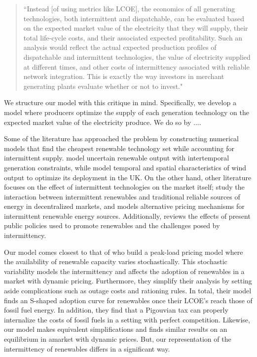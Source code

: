 \documentclass[11pt,a4paper]{extarticle}
\begin{document}
\begin{quote}
	``Instead [of using metrics like LCOE], the economics of all generating technologies, both intermittent and dispatchable, can be evaluated based on the expected market value of the electricity that
	they will supply, their total life-cycle costs, and their associated expected profitability. Such an
	analysis would reflect the actual expected production profiles of dispatchable and intermittent
	technologies, the value of electricity supplied at different times, and other costs of intermittency
	associated with reliable network integration. This is exactly the way investors in merchant generating plants evaluate whether or not to invest."
\end{quote}
We structure our model with this critique in mind. Specifically, we develop a model where producers optimize the supply of each generation technology on the expected market value of the electricity produce. We do so by ....

Some of the literature has approached the problem by constructing numerical models that find the cheapest renewable technology set while accounting for intermittent supply. \citet{MN2006} model uncertain renewable output with intertemporal generation constraints, while \citet{NCK2007} model temporal and spatial characteristics of wind output to optimize its deployment in the UK. On the other hand, other literature focuses on the effect of intermittent technologies on the market itself; \citet{AC2012} study the interaction between intermittent renewables and traditional reliable sources of energy in decentralized markets, and \citet{Chao2011} models alternative pricing mechanisms for intermittent renewable energy sources. Additionally, \citet{Boren2012} reviews the effects of present public policies used to promote renewables and the challenges posed by intermittency. 

Our model comes closest to that of \citet{HH} who build a peak-load pricing model where the availability of renewable capacity varies stochastically. This stochastic variability models the intermittency and affects the adoption of renewables in a market with dynamic pricing. Furthermore, they simplify their analysis by setting aside complications such as  outage costs and rationing rules. In total, their model finds an S-shaped adoption curve for renewables once their LCOE's reach those of fossil fuel energy. In addition, they find that a Pigouvian tax can properly internalize the costs of fossil fuels in a setting with perfect competition. Likewise, our model makes equivalent simplifications and finds similar results on an equilibrium in  amarket with dynamic prices. But, our representation of the intermittency of renewables differs in a significant way. 
\end{document}
